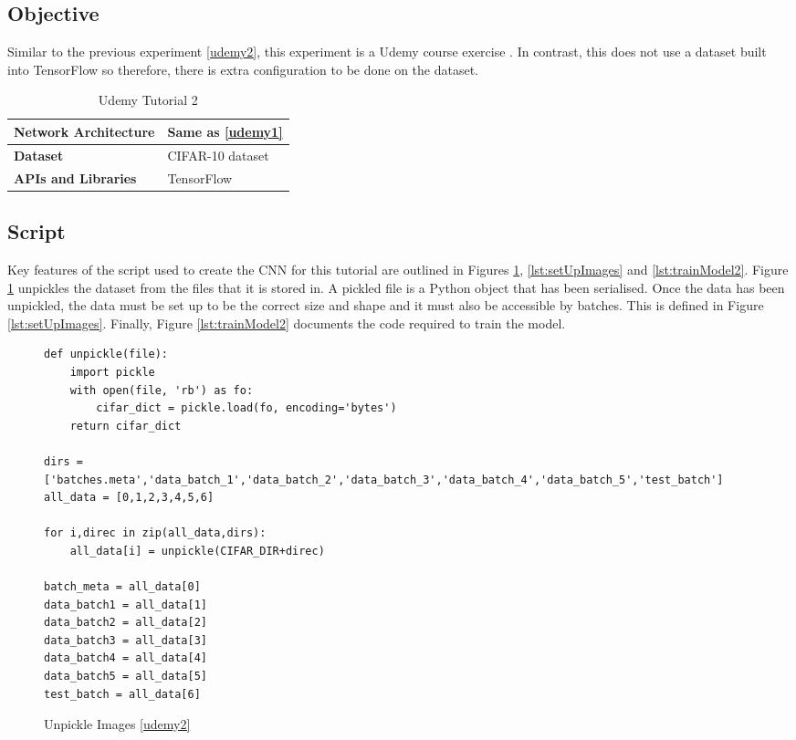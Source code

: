\tocless\subsection{Objective}
Similar to the previous experiment \ref{udemy2}, this experiment is a Udemy course exercise \parencite{udemy}. In contrast, this does not use a dataset built into TensorFlow so therefore, there is extra configuration to be done on the dataset.

\begin{table}[h]
\centering
\caption{Udemy Tutorial 2}
\label{my-label}
\begin{tabular}{|l|p{8cm}|}
\hline
\textbf{Network Architecture} & Same as \ref{udemy1}            \\ \hline
\textbf{Dataset}              & CIFAR-10 dataset \\ \hline
\textbf{APIs and Libraries}   & TensorFlow                                                         \\ \hline
\end{tabular}
\end{table}

\tocless\subsection{Script}
Key features of the script used to create the CNN for this tutorial are outlined in Figures \ref{lst:unpickle}, \ref{lst:setUpImages} and \ref{lst:trainModel2}.
Figure \ref{lst:unpickle} unpickles the dataset from the files that it is stored in.
A pickled file is a Python object that has been serialised.
Once the data has been unpickled, the data must be set up to be the correct size and shape and it must also be accessible by batches.
This is defined in Figure \ref{lst:setUpImages}.
Finally, Figure \ref{lst:trainModel2} documents the code required to train the model.

\begin{figure}[h]
\caption{Unpickle Images \ref{udemy2}}
\label{lst:unpickle}
\begin{lstlisting}[style=Python]
def unpickle(file):
    import pickle
    with open(file, 'rb') as fo:
        cifar_dict = pickle.load(fo, encoding='bytes')
    return cifar_dict

dirs = ['batches.meta','data_batch_1','data_batch_2','data_batch_3','data_batch_4','data_batch_5','test_batch']
all_data = [0,1,2,3,4,5,6]

for i,direc in zip(all_data,dirs):
    all_data[i] = unpickle(CIFAR_DIR+direc)

batch_meta = all_data[0]
data_batch1 = all_data[1]
data_batch2 = all_data[2]
data_batch3 = all_data[3]
data_batch4 = all_data[4]
data_batch5 = all_data[5]
test_batch = all_data[6]
\end{lstlisting}
\end{figure}

